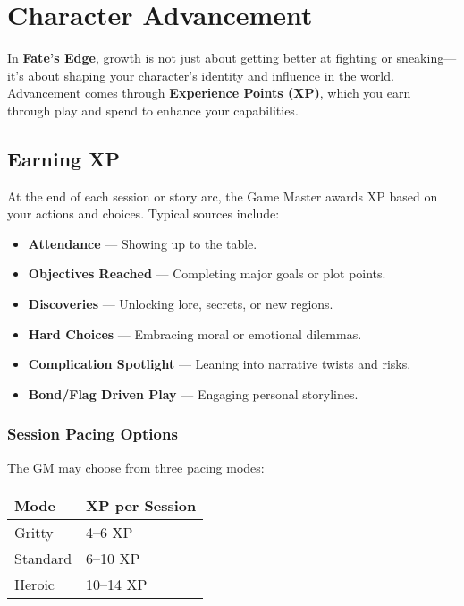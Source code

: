 
\chapter{Character Advancement}

In \textbf{Fate’s Edge}, growth is not just about getting better at fighting or sneaking—it’s about shaping your character’s identity and influence in the world. Advancement comes through \textbf{Experience Points (XP)}, which you earn through play and spend to enhance your capabilities.

\section{Earning XP}

At the end of each session or story arc, the Game Master awards XP based on your actions and choices. Typical sources include:

\begin{itemize}
  \item \textbf{Attendance} — Showing up to the table.
  \item \textbf{Objectives Reached} — Completing major goals or plot points.
  \item \textbf{Discoveries} — Unlocking lore, secrets, or new regions.
  \item \textbf{Hard Choices} — Embracing moral or emotional dilemmas.
  \item \textbf{Complication Spotlight} — Leaning into narrative twists and risks.
  \item \textbf{Bond/Flag Driven Play} — Engaging personal storylines.
\end{itemize}

\subsection*{Session Pacing Options}

The GM may choose from three pacing modes:

\begin{center}
\begin{tabular}{ll}
\toprule
\textbf{Mode} & \textbf{XP per Session} \\
\midrule
Gritty & 4–6 XP \\
Standard & 6–10 XP \\
Heroic & 10–14 XP \\
\bottomrule
\end{tabular}
\end{center}

